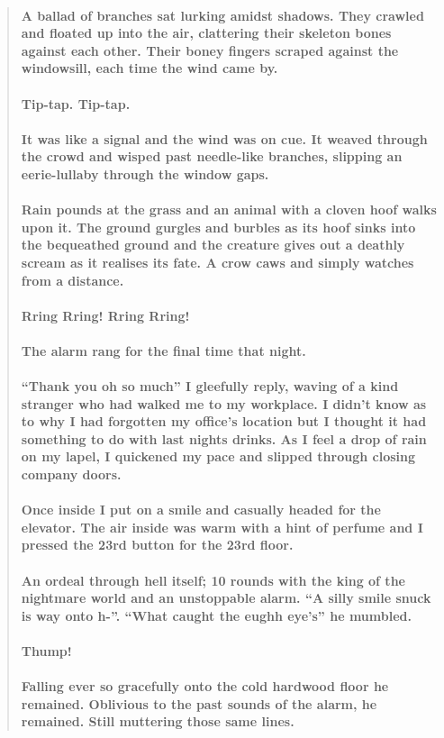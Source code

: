 \documentclass{book}
\begin{document}
\begin{quote}
\paragraph{A ballad of branches sat lurking amidst shadows.
They crawled and floated up into the air, clattering their skeleton bones against each other.
Their boney fingers scraped against the windowsill, each time the wind came by.
\\\\Tip-tap. Tip-tap.
\\\\It was like a signal and the wind was on cue.
It weaved through the crowd and wisped past needle-like branches, slipping an eerie-lullaby through the window gaps.
\\\\Rain pounds at the grass and an animal with a cloven hoof walks upon it.
The ground gurgles and burbles as its hoof sinks into the bequeathed ground and the creature gives out a deathly scream as it realises its fate. A crow caws and simply watches from a distance.
\\\\Rring Rring! Rring Rring!
\\\\The alarm rang for the final time that night.}
\paragraph{``Thank you oh so much'' I gleefully reply, waving of a kind stranger who had walked me to my workplace. I didn't know as to why I had forgotten my office's location but I thought it had something to do with last nights drinks. As I feel a drop of rain on my lapel, I quickened my pace and slipped through closing company doors.
\\\\Once inside I put on a smile and casually headed for the elevator. The air inside was warm with a hint of perfume and I pressed the 23rd button for the 23rd floor.
}

\paragraph{
An ordeal through hell itself; 10 rounds with the king of the nightmare world and an unstoppable alarm.
``A silly smile snuck is way onto h-''.
``What caught the eughh eye's'' he mumbled.\\\\Thump!\\\\Falling ever so gracefully onto the cold hardwood floor he remained. Oblivious to the past sounds of the alarm, he remained. Still muttering those same lines.}






\end{quote}
\end{document}

